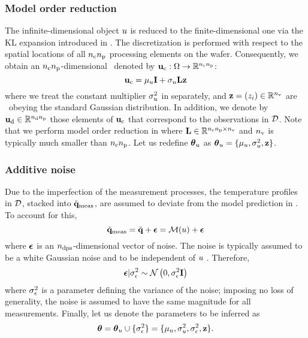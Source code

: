 \subsubsection{Model order reduction}
The infinite-dimensional object $u$ is reduced to the finite-dimensional one via the KL expansion introduced in . The discretization is performed with respect to the spatial locations of all ${n_{\text{c}}} {n_\text{p}}$ processing elements on the wafer. Consequently, we obtain an ${n_{\text{c}}} {n_\text{p}}$-dimensional \rv\ denoted by $\mathbf{u}_{\text{c}}: \Omega \to \mathbb{R}^{{n_{\text{c}}} {n_\text{p}}}$:
\begin{equation} \elabel{kl-approximation}
  \vu_\dies = \mu_\u \vI + \sigma_\u \mKL \vz
\end{equation}
where we treat the constant multiplier $\sigma^2_u$ in  separately, and $\mathbf{z} = (z_i) \in \mathbb{R}^{n_\text{v}}$ are \rvs\ obeying the standard Gaussian distribution. In addition, we denote by $\mathbf{u}_{\text{d}} \in \mathbb{R}^{{n_{\text{d}}} {n_\text{p}}}$ those elements of $\mathbf{u}_{\text{c}}$ that correspond to the observations in $\mathcal{D}$. Note that we perform model order reduction in  where $\mathbf{L} \in \mathbb{R}^{{n_{\text{c}}} {n_\text{p}} \times {n_\text{v}}}$ and ${n_\text{v}}$ is typically much smaller than ${n_{\text{c}}} {n_\text{p}}$. Let us redefine ${\boldsymbol\theta}_u$ as ${\boldsymbol\theta}_u = \{ \mu_u, \sigma_u^2, \mathbf{z} \}$.

\subsubsection{Additive noise}
Due to the imperfection of the measurement processes, the temperature profiles in $\mathcal{D}$, stacked into $\tilde{\mathbf{q}}_{\text{meas}}$, are assumed to deviate from the model prediction in . To account for this,
\[
  \mvT_\meas = \mvT + \vnoise = \model{\u} + \vnoise
\]
where $\boldsymbol\epsilon$ is an ${n_\text{dps}}$-dimensional vector of noise. The noise is typically assumed to be a white Gaussian noise and to be independent of $u$ \cite{mackay2003, rasmussen2006, marzouk2009}. Therefore,
\[
  \boldsymbol\epsilon | \sigma^2_\epsilon \sim \mathcal{N}\left( 0, \sigma^2_\epsilon \mathbf{I} \right)
\]
where $\sigma^2_\epsilon$ is a parameter defining the variance of the noise; imposing no loss of generality, the noise is assumed to have the same magnitude for all measurements. Finally, let us denote the parameters to be inferred as
\[
  {\boldsymbol\theta} = {\boldsymbol\theta}_u \cup \{ \sigma_\epsilon^2 \} = \{ \mu_u, \sigma_u^2, \sigma_\epsilon^2, \mathbf{z} \}.
\]

